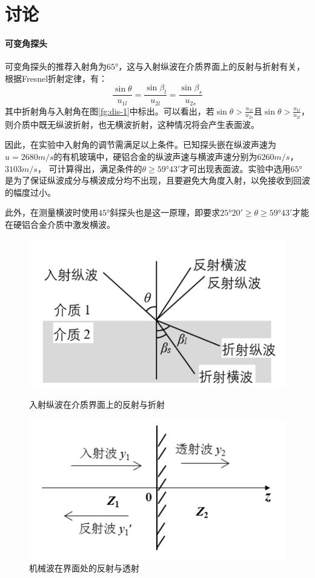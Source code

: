 \documentclass[UTF8,a4paper]{article}%
\begin{document}
\section{讨论}
\paragraph{可变角探头}
可变角探头的推荐入射角为$\ang{65}$，这与入射纵波在介质界面上的反射与折射有关，根据Fresnel折射定律，有：
$$\frac{\sin\theta}{u_{1l}}=\frac{\sin\beta_l}{u_{2l}}=\frac{\sin\beta_s}{u_{2s}}$$
其中折射角与入射角在图\ref{fg:dis-1}中标出。可以看出，若$\sin\theta>\frac{u_{1l}}{u_{2s}}$且$\sin\theta>\frac{u_{1l}}{u_{2l}}$，则介质中既无纵波折射，也无横波折射，这种情况将会产生表面波。

因此，在实验中入射角的调节需满足以上条件。已知探头嵌在纵波声速为$u=2680\unit{m/s}$的有机玻璃中，硬铝合金的纵波声速与横波声速分别为$6260\unit{m/s}$，$3103\unit{m/s}$，
可计算得出，满足条件的$\theta\geq\ang{59;43}$才可出现表面波。实验中选用$\ang{65}$是为了保证纵波成分与横波成分均不出现，且要避免大角度入射，以免接收到回波的幅度过小。

此外，在测量横波时使用$\ang{45}$斜探头也是这一原理，即要求$\ang{25;20}\geq\theta\geq\ang{59;43}$才能在硬铝合金介质中激发横波。
\begin{figure}[H] %
    \centering
    \begin{minipage}[t]{0.5\linewidth}
        \centering
        \includegraphics[width=0.95\linewidth]{fresnel.png}
        \caption{入射纵波在介质界面上的反射与折射}
        \label{fg:dis-1}
    \end{minipage}%
    \begin{minipage}[t]{0.5\linewidth}
        \centering
        \includegraphics[width=0.95\linewidth]{r-t.png}
        \caption{机械波在界面处的反射与透射}
        \label{fg:dis-2}
    \end{minipage}
\end{figure}
\end{document}
